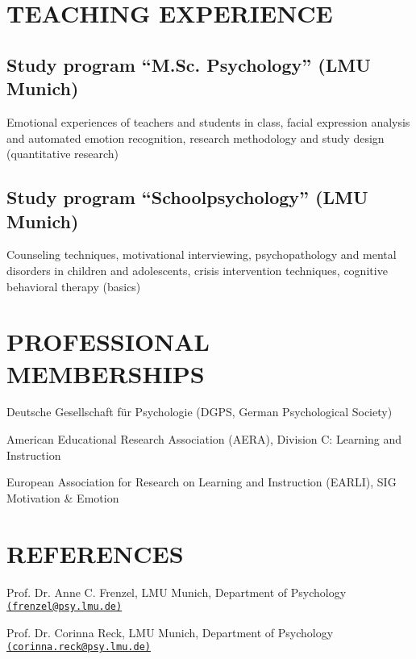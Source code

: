 \documentclass[letterpaper]{article}
\renewenvironment{itemize}{ %
  \begin{list}{}{ %
    \setlength{\leftmargin}{2.5em} %
  }
}{
  \end{list}
}
\begin{document}
\section*{TEACHING EXPERIENCE}
\subsection*{Study program “M.Sc. Psychology” (LMU Munich)}
\begin{itemize}
\item Emotional experiences of teachers and students in class, facial expression analysis and automated emotion recognition, research methodology and study design (quantitative research)
\end{itemize}

\subsection*{Study program “Schoolpsychology” (LMU Munich)}
\begin{itemize}
\item Counseling techniques, motivational interviewing, psychopathology and mental disorders in children and adolescents, crisis intervention techniques, cognitive behavioral therapy (basics)
\end{itemize}


\section*{PROFESSIONAL MEMBERSHIPS}
\begin{itemize}
\item[$\ast$] Deutsche Gesellschaft für Psychologie (DGPS, German Psychological Society)
\item[$\ast$] American Educational Research Association (AERA), Division C: Learning and Instruction
\item[$\ast$] European Association for Research on Learning and Instruction (EARLI), SIG Motivation \& Emotion
\end{itemize}


\section*{REFERENCES}
\begin{itemize}
\item[$\ast$] Prof. Dr. Anne C. Frenzel, LMU Munich, Department of Psychology \href{mailto:frenzel@psy.lmu.de}{\tt (frenzel@psy.lmu.de)} 
\item[$\ast$] Prof. Dr. Corinna Reck, LMU Munich, Department of Psychology \href{mailto:corinna.reck@psy.lmu.de}{\tt (corinna.reck@psy.lmu.de)} 
\end{itemize}

\begin{center} 


\end{center}
\end{document}
